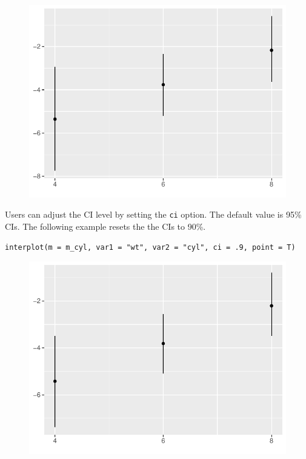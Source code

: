 \documentclass[
  article]{jss}
\begin{document}
\begin{figure}[H]

{\centering \includegraphics{jss_manuscript_files/figure-pdf/unnamed-chunk-4-1.pdf}

}

\end{figure}

Users can adjust the CI level by setting the \texttt{ci} option. The
default value is 95\% CIs. The following example resets the the CIs to
90\%.

\begin{verbatim}
interplot(m = m_cyl, var1 = "wt", var2 = "cyl", ci = .9, point = T)
\end{verbatim}

\begin{figure}[H]

{\centering \includegraphics{jss_manuscript_files/figure-pdf/unnamed-chunk-5-1.pdf}

}

\end{figure}
\end{document}
